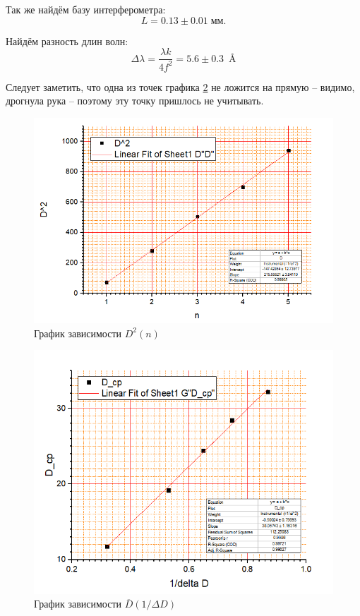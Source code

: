 \documentclass[a4paper]{article}
\begin{document}
Так же найдём базу интерферометра:
\begin{equation*}\label{key}
	L = 0.13\pm 0.01 \; мм.
\end{equation*}

Найдём разность длин волн:
\begin{equation*}\label{key}
	\Delta \lambda = \frac{\lambda k}{4 f^2} = 5.6\pm 0.3\; \SI{}{\angstrom}
\end{equation*}

Следует заметить, что одна из точек графика \ref{fig:screenshot7} не ложится на прямую -- видимо, дрогнула рука -- поэтому эту точку пришлось не учитывать.

\begin{figure}[]
	\centering
	\includegraphics[width=0.8\linewidth]{Screenshot_6}
	\caption{График зависимости $ D^2(n)$}
	\label{fig:screenshot6}
\end{figure}

\begin{figure}[]
	\centering
	\includegraphics[width=0.8\linewidth]{Screenshot_7}
	\caption{График зависимости $\overline{D}(1/\Delta D)$}
	\label{fig:screenshot7}
\end{figure}
\end{document}
